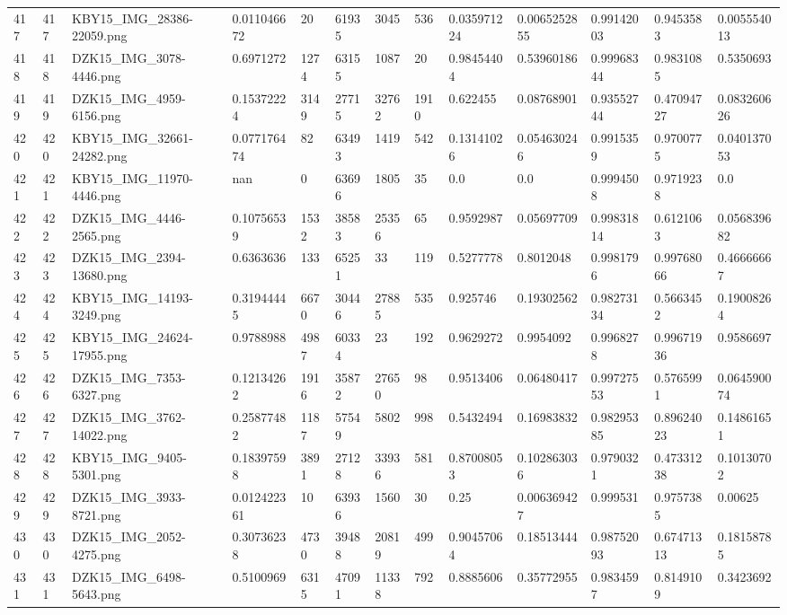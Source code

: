 \documentclass[11pt, a4paper, twoside]{report}
\begin{document}
\begin{longtable}[c]{@{}lllllllllllll@{}}
417 & 417 & KBY15\_IMG\_28386-22059.png & 0.011046672 & 20 & 61935 & 3045 & 536 & 0.035971224 & 0.0065252855 & 0.99142003 & 0.9453583 & 0.005554013 \\
418 & 418 & DZK15\_IMG\_3078-4446.png & 0.6971272 & 1274 & 63155 & 1087 & 20 & 0.98454404 & 0.53960186 & 0.99968344 & 0.9831085 & 0.5350693 \\
419 & 419 & DZK15\_IMG\_4959-6156.png & 0.15372224 & 3149 & 27715 & 32762 & 1910 & 0.622455 & 0.08768901 & 0.93552744 & 0.47094727 & 0.083260626 \\
420 & 420 & KBY15\_IMG\_32661-24282.png & 0.077176474 & 82 & 63493 & 1419 & 542 & 0.13141026 & 0.054630246 & 0.9915359 & 0.9700775 & 0.040137053 \\
421 & 421 & KBY15\_IMG\_11970-4446.png & nan & 0 & 63696 & 1805 & 35 & 0.0 & 0.0 & 0.9994508 & 0.9719238 & 0.0 \\
422 & 422 & DZK15\_IMG\_4446-2565.png & 0.10756539 & 1532 & 38583 & 25356 & 65 & 0.9592987 & 0.05697709 & 0.99831814 & 0.6121063 & 0.056839682 \\
423 & 423 & DZK15\_IMG\_2394-13680.png & 0.6363636 & 133 & 65251 & 33 & 119 & 0.5277778 & 0.8012048 & 0.9981796 & 0.99768066 & 0.46666667 \\
424 & 424 & KBY15\_IMG\_14193-3249.png & 0.31944445 & 6670 & 30446 & 27885 & 535 & 0.925746 & 0.19302562 & 0.98273134 & 0.5663452 & 0.19008264 \\
425 & 425 & KBY15\_IMG\_24624-17955.png & 0.9788988 & 4987 & 60334 & 23 & 192 & 0.9629272 & 0.9954092 & 0.9968278 & 0.99671936 & 0.9586697 \\
426 & 426 & DZK15\_IMG\_7353-6327.png & 0.12134262 & 1916 & 35872 & 27650 & 98 & 0.9513406 & 0.06480417 & 0.99727553 & 0.5765991 & 0.064590074 \\
427 & 427 & DZK15\_IMG\_3762-14022.png & 0.25877482 & 1187 & 57549 & 5802 & 998 & 0.5432494 & 0.16983832 & 0.98295385 & 0.89624023 & 0.14861651 \\
428 & 428 & KBY15\_IMG\_9405-5301.png & 0.18397598 & 3891 & 27128 & 33936 & 581 & 0.87008053 & 0.102863036 & 0.9790321 & 0.47331238 & 0.10130702 \\
429 & 429 & DZK15\_IMG\_3933-8721.png & 0.012422361 & 10 & 63936 & 1560 & 30 & 0.25 & 0.006369427 & 0.999531 & 0.9757385 & 0.00625 \\
430 & 430 & DZK15\_IMG\_2052-4275.png & 0.30736238 & 4730 & 39488 & 20819 & 499 & 0.90457064 & 0.18513444 & 0.98752093 & 0.67471313 & 0.18158785 \\
431 & 431 & DZK15\_IMG\_6498-5643.png & 0.5100969 & 6315 & 47091 & 11338 & 792 & 0.8885606 & 0.35772955 & 0.9834597 & 0.8149109 & 0.3423692 \\

\end{longtable}
\end{document}

